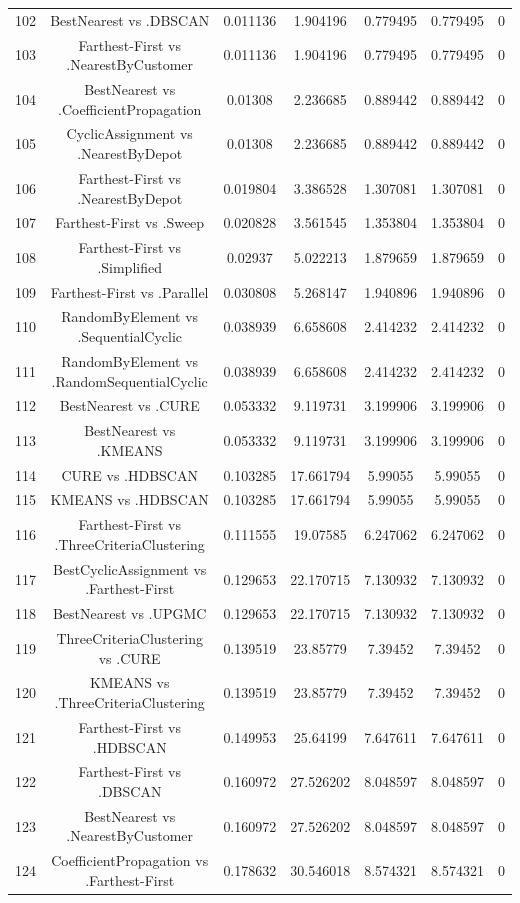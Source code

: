 \documentclass[a4paper,10pt]{article}
\begin{document}
\begin{landscape}
\begin{table}[!htp]
\begin{tabular}{ccccccc}
102&BestNearest vs .DBSCAN&0.011136&1.904196&0.779495&0.779495&0\\
103&Farthest-First vs .NearestByCustomer&0.011136&1.904196&0.779495&0.779495&0\\
104&BestNearest vs .CoefficientPropagation&0.01308&2.236685&0.889442&0.889442&0\\
105&CyclicAssignment vs .NearestByDepot&0.01308&2.236685&0.889442&0.889442&0\\
106&Farthest-First vs .NearestByDepot&0.019804&3.386528&1.307081&1.307081&0\\
107&Farthest-First vs .Sweep&0.020828&3.561545&1.353804&1.353804&0\\
108&Farthest-First vs .Simplified&0.02937&5.022213&1.879659&1.879659&0\\
109&Farthest-First vs .Parallel&0.030808&5.268147&1.940896&1.940896&0\\
110&RandomByElement vs .SequentialCyclic&0.038939&6.658608&2.414232&2.414232&0\\
111&RandomByElement vs .RandomSequentialCyclic&0.038939&6.658608&2.414232&2.414232&0\\
112&BestNearest vs .CURE&0.053332&9.119731&3.199906&3.199906&0\\
113&BestNearest vs .KMEANS&0.053332&9.119731&3.199906&3.199906&0\\
114&CURE vs .HDBSCAN&0.103285&17.661794&5.99055&5.99055&0\\
115&KMEANS vs .HDBSCAN&0.103285&17.661794&5.99055&5.99055&0\\
116&Farthest-First vs .ThreeCriteriaClustering&0.111555&19.07585&6.247062&6.247062&0\\
117&BestCyclicAssignment vs .Farthest-First&0.129653&22.170715&7.130932&7.130932&0\\
118&BestNearest vs .UPGMC&0.129653&22.170715&7.130932&7.130932&0\\
119&ThreeCriteriaClustering vs .CURE&0.139519&23.85779&7.39452&7.39452&0\\
120&KMEANS vs .ThreeCriteriaClustering&0.139519&23.85779&7.39452&7.39452&0\\
121&Farthest-First vs .HDBSCAN&0.149953&25.64199&7.647611&7.647611&0\\
122&Farthest-First vs .DBSCAN&0.160972&27.526202&8.048597&8.048597&0\\
123&BestNearest vs .NearestByCustomer&0.160972&27.526202&8.048597&8.048597&0\\
124&CoefficientPropagation vs .Farthest-First&0.178632&30.546018&8.574321&8.574321&0\\

\end{tabular}
\end{table}
\end{landscape}
\end{document}
